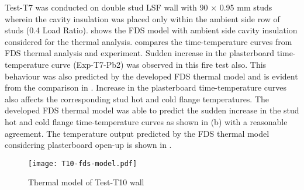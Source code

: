 Test-T7 was conducted on double stud LSF wall with 90 $\times$ 0.95 mm studs wherein the cavity insulation was placed only within the ambient side row of studs (0.4 Load Ratio).  shows the FDS model with ambient side cavity insulation considered for the thermal analysis.  compares the time-temperature curves from FDS thermal analysis and experiment. Sudden increase in the plasterboard time-temperature curve (Exp-T7-Pb2) was observed in this fire test also. This behaviour was also predicted by the developed FDS thermal model and is evident from the comparison in . Increase in the plasterboard time-temperature curves also affects the corresponding stud hot and cold flange temperatures. The developed FDS thermal model was able to predict the sudden increase in the stud hot and cold flange time-temperature curves as shown in  (b) with a reasonable agreement. The temperature output predicted by the FDS thermal model considering plasterboard open-up is shown in .
\begin{figure}[!htbp]
	\centering
		\texttt{[image: T10-fds-model.pdf]}
		\caption{Thermal model of Test-T10 wall}
		\label{fig:T10-fds-model-cavity}
\end{figure}

